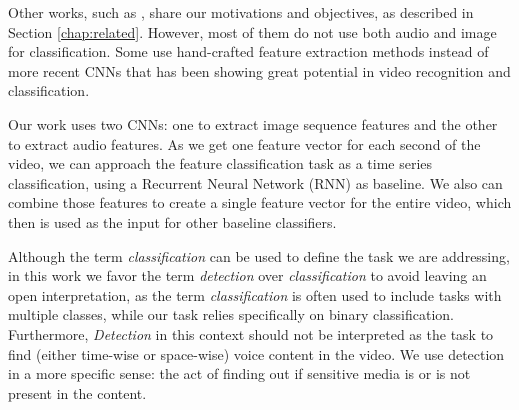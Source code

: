 Other works, such as \cite{moreira2019multimodal}, share our motivations and objectives, as described in Section \ref{chap:related}. However, most of them do not use both audio and image for classification. Some use hand-crafted feature extraction methods instead of more recent CNNs that has been showing great potential in video recognition and classification.

Our work uses two CNNs: one to extract image sequence features and the other to extract audio features.
As we get one feature vector for each second of the video, we can approach the feature classification task as a time series classification, using a Recurrent Neural Network (RNN) as baseline. We also can combine those features to create a single feature vector for the entire video, which then is used as the input for other baseline classifiers.




Although the term \textit{classification} can be used to define the task we are addressing, in this work we favor the term \textit{detection} over \textit{classification} to avoid leaving an open interpretation, as the term \textit{classification} is often used to include tasks with multiple classes, while our task relies specifically on binary classification. Furthermore, \textit{Detection} in this context should not be interpreted as the task to find (either time-wise or space-wise) voice content in the video.
We use detection in a more specific sense: the act of finding out if sensitive media is or is not present in the content. 







